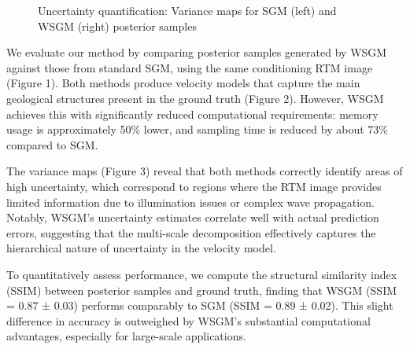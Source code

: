 \documentclass{IMAGE2025}
\begin{document}
\begin{figure}


\caption{\label{fig-uncertainty}Uncertainty quantification: Variance
maps for SGM (left) and WSGM (right) posterior samples}

\end{figure}%

We evaluate our method by comparing posterior samples generated by WSGM
against those from standard SGM, using the same conditioning RTM image
(Figure 1). Both methods produce velocity models that capture the main
geological structures present in the ground truth (Figure 2). However,
WSGM achieves this with significantly reduced computational
requirements: memory usage is approximately 50\% lower, and sampling
time is reduced by about 73\% compared to SGM.

The variance maps (Figure 3) reveal that both methods correctly identify
areas of high uncertainty, which correspond to regions where the RTM
image provides limited information due to illumination issues or complex
wave propagation. Notably, WSGM's uncertainty estimates correlate well
with actual prediction errors, suggesting that the multi-scale
decomposition effectively captures the hierarchical nature of
uncertainty in the velocity model.

To quantitatively assess performance, we compute the structural
similarity index (SSIM) between posterior samples and ground truth,
finding that WSGM (SSIM = 0.87 ± 0.03) performs comparably to SGM (SSIM
= 0.89 ± 0.02). This slight difference in accuracy is outweighed by
WSGM's substantial computational advantages, especially for large-scale
applications.
\end{document}

